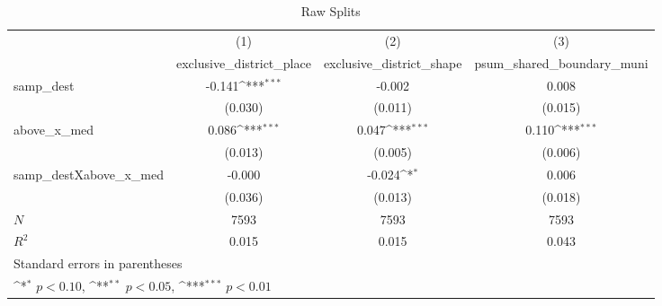\begin{table}[htbp]\centering
\def\sym#1{\ifmmode^{#1}\else\(^{#1}\)\fi}
\caption{Raw Splits}
\begin{tabular}{l*{3}{c}}
\hline\hline
            &\multicolumn{1}{c}{(1)}&\multicolumn{1}{c}{(2)}&\multicolumn{1}{c}{(3)}\\
            &\multicolumn{1}{c}{exclusive\_district\_place}&\multicolumn{1}{c}{exclusive\_district\_shape}&\multicolumn{1}{c}{psum\_shared\_boundary\_muni}\\
\hline
samp\_dest   &      -0.141\sym{***}&      -0.002         &       0.008         \\
            &     (0.030)         &     (0.011)         &     (0.015)         \\
[1em]
above\_x\_med &       0.086\sym{***}&       0.047\sym{***}&       0.110\sym{***}\\
            &     (0.013)         &     (0.005)         &     (0.006)         \\
[1em]
samp\_destXabove\_x\_med&      -0.000         &      -0.024\sym{*}  &       0.006         \\
            &     (0.036)         &     (0.013)         &     (0.018)         \\
\hline
\(N\)       &        7593         &        7593         &        7593         \\
\(R^{2}\)   &       0.015         &       0.015         &       0.043         \\
\hline\hline
\multicolumn{4}{l}{\footnotesize Standard errors in parentheses}\\
\multicolumn{4}{l}{\footnotesize \sym{*} \(p<0.10\), \sym{**} \(p<0.05\), \sym{***} \(p<0.01\)}\\
\end{tabular}
\end{table}
